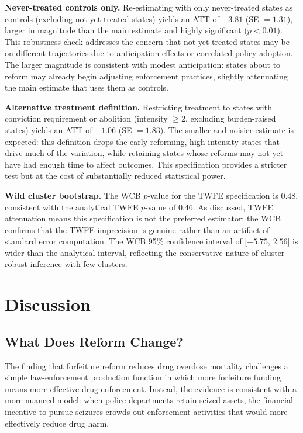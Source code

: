 \documentclass[12pt]{article}
\begin{document}
\textbf{Never-treated controls only.} Re-estimating with only never-treated states as controls (excluding not-yet-treated states) yields an ATT of $-3.81$ (SE $= 1.31$), larger in magnitude than the main estimate and highly significant ($p < 0.01$). This robustness check addresses the concern that not-yet-treated states may be on different trajectories due to anticipation effects or correlated policy adoption. The larger magnitude is consistent with modest anticipation: states about to reform may already begin adjusting enforcement practices, slightly attenuating the main estimate that uses them as controls.

\textbf{Alternative treatment definition.} Restricting treatment to states with conviction requirement or abolition (intensity $\geq 2$, excluding burden-raised states) yields an ATT of $-1.06$ (SE $= 1.83$). The smaller and noisier estimate is expected: this definition drops the early-reforming, high-intensity states that drive much of the variation, while retaining states whose reforms may not yet have had enough time to affect outcomes. This specification provides a stricter test but at the cost of substantially reduced statistical power.

\textbf{Wild cluster bootstrap.} The WCB $p$-value for the TWFE specification is 0.48, consistent with the analytical TWFE $p$-value of 0.46. As discussed, TWFE attenuation means this specification is not the preferred estimator; the WCB confirms that the TWFE imprecision is genuine rather than an artifact of standard error computation. The WCB 95\% confidence interval of [$-5.75$, $2.56$] is wider than the analytical interval, reflecting the conservative nature of cluster-robust inference with few clusters.




\section{Discussion}
\label{sec:discussion}

\subsection{What Does Reform Change?}

The finding that forfeiture reform reduces drug overdose mortality challenges a simple law-enforcement production function in which more forfeiture funding means more effective drug enforcement. Instead, the evidence is consistent with a more nuanced model: when police departments retain seized assets, the financial incentive to pursue seizures crowds out enforcement activities that would more effectively reduce drug harm.
\end{document}
